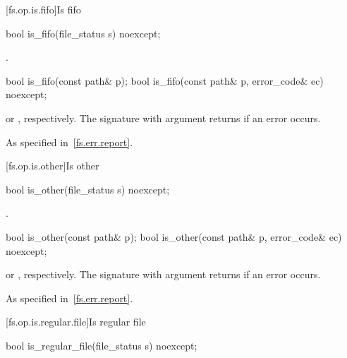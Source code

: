 [fs.op.is.fifo]{Is fifo}

%
\begin{itemdecl}
bool is_fifo(file_status s) noexcept;
\end{itemdecl}

\begin{itemdescr}
\pnum
\returns
{}.
\end{itemdescr}


%
\begin{itemdecl}
bool is_fifo(const path& p);
bool is_fifo(const path& p, error_code& ec) noexcept;
\end{itemdecl}

\begin{itemdescr}
\pnum
\returns
{} or , respectively.
The signature with argument  returns  if an error occurs.

\pnum
\throws
As specified in~\ref{fs.err.report}.
\end{itemdescr}


[fs.op.is.other]{Is other}

%
\begin{itemdecl}
bool is_other(file_status s) noexcept;
\end{itemdecl}

\begin{itemdescr}
\pnum
\returns
{}.
\end{itemdescr}

%
\begin{itemdecl}
bool is_other(const path& p);
bool is_other(const path& p, error_code& ec) noexcept;
\end{itemdecl}

\begin{itemdescr}
\pnum
\returns
{} or ,
  respectively. The signature with argument  returns 
  if an error occurs.

\pnum
\throws
As specified in~\ref{fs.err.report}.
\end{itemdescr}


[fs.op.is.regular.file]{Is regular file}

%
\begin{itemdecl}
bool is_regular_file(file_status s) noexcept;
\end{itemdecl}


